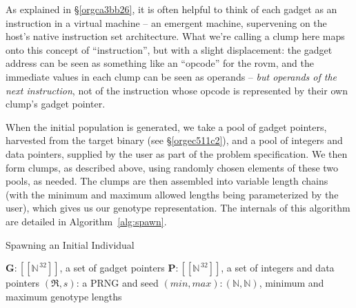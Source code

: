 \documentclass[12pt,glossary]{dalthesis}
\begin{document}
As explained in \S \ref{orgca3bb26}, it is often helpful to think of
each gadget as an instruction in a virtual machine -- an emergent machine,
supervening on the host's native instruction set architecture. What we're
calling a clump here maps onto this concept of ``instruction'', but with a
slight displacement: the gadget address can be seen as something
like an ``opcode'' for the \gls{rovm}, and the immediate values in each clump
can be seen as operands -- \emph{but operands of the next instruction}, not of
the instruction whose opcode is represented by their own clump's gadget
pointer.

When the initial population is generated, we take a pool of gadget pointers, 
harvested from the target binary (see \S \ref{orgec511c2}), and a
pool of integers and data pointers, supplied by the user as part of the problem
specification. We then form clumps, as described above, using randomly chosen
elements of these two pools, as needed. The clumps are then assembled into 
variable length chains (with the minimum and maximum allowed lengths being
parameterized by the user), which gives us our genotype representation. The
internals of this algorithm are detailed in Algorithm~\ref{alg:spawn}.

\begin{algorithm}
\caption{Spawning an Initial Individual}
\label{alg:spawn}
\begin{algorithmic}[1]
\REQUIRE $\mathbf{G}: [\![\mathbb{N}^{\,32}]\!]$, a set of gadget pointers
\REQUIRE $\mathbf{P}: [\![\mathbb{N}^{\,32}]\!]$, a set of integers and data pointers
\REQUIRE $(\mathfrak{R}, s)$: a PRNG and seed
\REQUIRE $(min, max): (\mathbb{N}, \mathbb{N})$, minimum and maximum genotype lengths
 
    \ENDFOR
\ENDFOR
\RETURN {$\Gamma$}
\end{algorithmic}
\end{algorithm}
\end{document}
